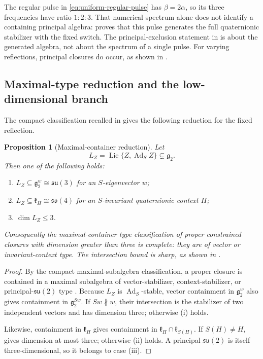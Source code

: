 \documentclass[11pt,a4paper]{article}
\newtheorem{proposition}[proposition]{Proposition}
\newcommand{\gtwo}{\mathfrak g_2}
\newcommand{\Lie}{\operatorname{Lie}}
\newcommand{\Ad}{\operatorname{Ad}}
\begin{document}
The regular pulse in \eqref{eq:uniform-regular-pulse} has $\beta=2\alpha$, so its three frequencies have ratio $1:2:3$.  That numerical spectrum alone does not identify a containing principal algebra:  proves that this pulse generates the full quaternionic stabilizer with the fixed switch.  The principal-exclusion statement in  is about the generated algebra, not about the spectrum of a single pulse.  For varying reflections, principal closures do occur, as shown in .

\subsection{Maximal-type reduction and the low-dimensional branch}
The compact classification recalled in  gives the following reduction for the fixed reflection.

\begin{proposition}[Maximal-container reduction]
\label{prop:maximal-reduction}
Let
\[
L_Z=\Lie\{Z,\Ad_SZ\}\subsetneq\gtwo.
\]
Then one of the following holds:
\begin{enumerate}[label=\textnormal{(\roman*)},leftmargin=9mm]
\item $L_Z\subseteq\gtwo^w\cong\mathfrak{su}(3)$ for an $S$-eigenvector $w$;
\item $L_Z\subseteq\mathfrak k_H\cong\mathfrak{so}(4)$ for an $S$-invariant quaternionic context $H$;
\item $\dim L_Z\le3$.
\end{enumerate}
Consequently the maximal-container type classification of proper constrained closures with dimension greater than three is complete: they are of vector or invariant-context type.  The intersection bound is sharp, as shown in .
\end{proposition}

\begin{proof}
By the compact maximal-subalgebra classification, a proper closure is contained in a maximal subalgebra of vector-stabilizer, context-stabilizer, or principal-$\mathfrak{su}(2)$ type \cite{Dynkin1952b,DraperMartin2025}.  Because $L_Z$ is $\Ad_S$-stable, vector containment in $\gtwo^w$ also gives containment in $\gtwo^{Sw}$.  If $Sw\not\parallel w$, their intersection is the stabilizer of two independent vectors and has dimension three; otherwise (i) holds.

Likewise, containment in $\mathfrak k_H$ gives containment in $\mathfrak k_H\cap\mathfrak k_{S(H)}$.  If $S(H)\ne H$,  gives dimension at most three; otherwise (ii) holds.  A principal $\mathfrak{su}(2)$ is itself three-dimensional, so it belongs to case (iii).
\end{proof}
\end{document}
